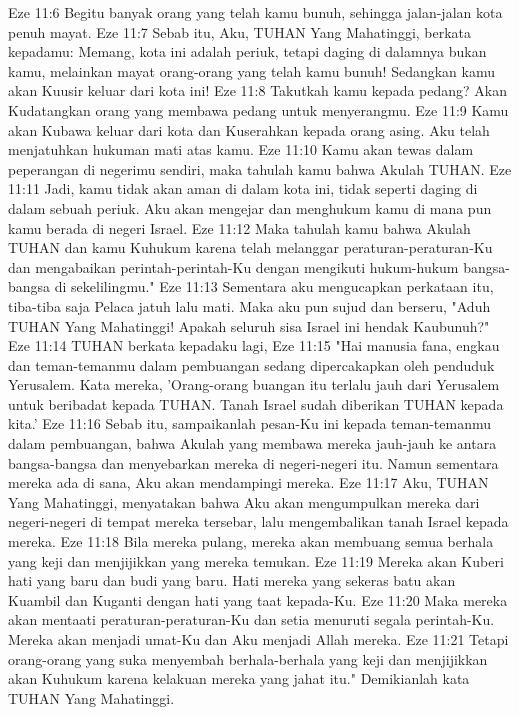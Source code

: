 Eze 11:6  Begitu banyak orang yang telah kamu bunuh, sehingga jalan-jalan kota penuh mayat.
Eze 11:7  Sebab itu, Aku, TUHAN Yang Mahatinggi, berkata kepadamu: Memang, kota ini adalah periuk, tetapi daging di dalamnya bukan kamu, melainkan mayat orang-orang yang telah kamu bunuh! Sedangkan kamu akan Kuusir keluar dari kota ini!
Eze 11:8  Takutkah kamu kepada pedang? Akan Kudatangkan orang yang membawa pedang untuk menyerangmu.
Eze 11:9  Kamu akan Kubawa keluar dari kota dan Kuserahkan kepada orang asing. Aku telah menjatuhkan hukuman mati atas kamu.
Eze 11:10  Kamu akan tewas dalam peperangan di negerimu sendiri, maka tahulah kamu bahwa Akulah TUHAN.
Eze 11:11  Jadi, kamu tidak akan aman di dalam kota ini, tidak seperti daging di dalam sebuah periuk. Aku akan mengejar dan menghukum kamu di mana pun kamu berada di negeri Israel.
Eze 11:12  Maka tahulah kamu bahwa Akulah TUHAN dan kamu Kuhukum karena telah melanggar peraturan-peraturan-Ku dan mengabaikan perintah-perintah-Ku dengan mengikuti hukum-hukum bangsa-bangsa di sekelilingmu."
Eze 11:13  Sementara aku mengucapkan perkataan itu, tiba-tiba saja Pelaca jatuh lalu mati. Maka aku pun sujud dan berseru, "Aduh TUHAN Yang Mahatinggi! Apakah seluruh sisa Israel ini hendak Kaubunuh?"
Eze 11:14  TUHAN berkata kepadaku lagi,
Eze 11:15  "Hai manusia fana, engkau dan teman-temanmu dalam pembuangan sedang dipercakapkan oleh penduduk Yerusalem. Kata mereka, 'Orang-orang buangan itu terlalu jauh dari Yerusalem untuk beribadat kepada TUHAN. Tanah Israel sudah diberikan TUHAN kepada kita.'
Eze 11:16  Sebab itu, sampaikanlah pesan-Ku ini kepada teman-temanmu dalam pembuangan, bahwa Akulah yang membawa mereka jauh-jauh ke antara bangsa-bangsa dan menyebarkan mereka di negeri-negeri itu. Namun sementara mereka ada di sana, Aku akan mendampingi mereka.
Eze 11:17  Aku, TUHAN Yang Mahatinggi, menyatakan bahwa Aku akan mengumpulkan mereka dari negeri-negeri di tempat mereka tersebar, lalu mengembalikan tanah Israel kepada mereka.
Eze 11:18  Bila mereka pulang, mereka akan membuang semua berhala yang keji dan menjijikkan yang mereka temukan.
Eze 11:19  Mereka akan Kuberi hati yang baru dan budi yang baru. Hati mereka yang sekeras batu akan Kuambil dan Kuganti dengan hati yang taat kepada-Ku.
Eze 11:20  Maka mereka akan mentaati peraturan-peraturan-Ku dan setia menuruti segala perintah-Ku. Mereka akan menjadi umat-Ku dan Aku menjadi Allah mereka.
Eze 11:21  Tetapi orang-orang yang suka menyembah berhala-berhala yang keji dan menjijikkan akan Kuhukum karena kelakuan mereka yang jahat itu." Demikianlah kata TUHAN Yang Mahatinggi.
